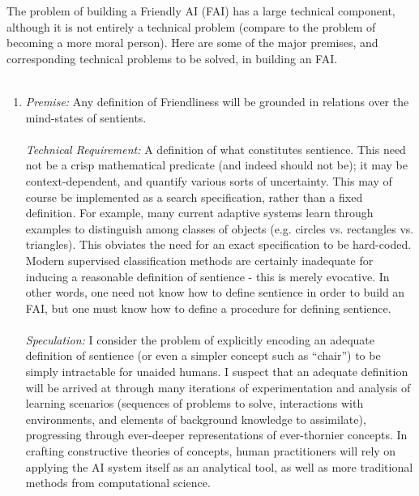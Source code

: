 \documentclass[twoside,11pt]{article}
\begin{document}
 The problem of building a Friendly AI (FAI) has a large technical component, although it is not entirely a technical problem (compare to the problem of becoming a more moral person). Here are some of the major premises, and corresponding technical problems to be solved, in building an FAI.\\ 
\\ 

\begin{enumerate}
\item \emph{Premise:}
 Any definition of Friendliness will be grounded in relations over the mind-states of sentients. \\ 
\\ 
\emph{Technical Requirement:}
 A definition of what constitutes sentience. This need not be a crisp mathematical predicate (and indeed should not be); it may be context-dependent, and quantify various sorts of uncertainty. This may of course be implemented as a search specification, rather than a fixed definition. For example, many current adaptive systems learn through examples to distinguish among classes of objects (e.g. circles vs. rectangles vs. triangles). This obviates the need for an exact specification to be hard-coded. Modern supervised classification methods are certainly inadequate for inducing a reasonable definition of sentience - this is merely evocative. In other words, one need not know how to define sentience in order to build an FAI, but one must know how to define a procedure for defining sentience. \\ 
\\ 
\emph{Speculation:}
 I consider the problem of explicitly encoding an adequate definition of sentience (or even a simpler concept such as ``chair'') to be simply intractable for unaided humans. I suspect that an adequate definition will be arrived at through many iterations of experimentation and analysis of learning scenarios (sequences of problems to solve, interactions with environments, and elements of background knowledge to assimilate), progressing through ever-deeper representations of ever-thornier concepts. In crafting constructive theories of concepts, human practitioners will rely on applying the AI system itself as an analytical tool, as well as more traditional methods from computational science. \\ 
\\ 
\\ 


\end{enumerate}
\end{document}

